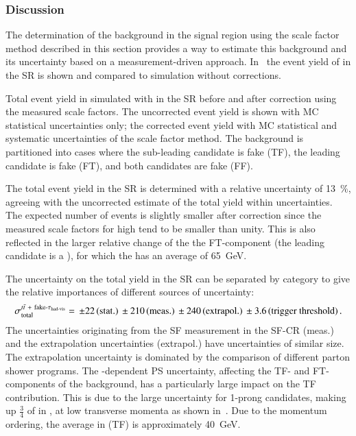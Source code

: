 \subsubsection{Discussion}

The determination of the \ttbarFakes background in the \hadhad signal region
using the scale factor method described in this section provides a way to
estimate this background and its uncertainty based on a measurement-driven
approach. In~ the event yield of \ttbarFakes in the
\hadhad SR is shown and compared to \ttbar simulation without corrections.

\begin{table}[htbp]
  \centering

  \caption{Total event yield in simulated \ttbar with \faketauhadvis
    in the \hadhad SR before and after correction using the measured
    scale factors. The uncorrected event yield is shown with MC
    statistical uncertainties only; the corrected event yield with MC
    statistical and systematic uncertainties of the scale factor
    method. The \ttbarFakes background is partitioned into cases where
    the \pT sub-leading \tauhadvis candidate is fake (TF), the leading
    candidate is fake (FT), and both candidates are fake (FF).}%
  \label{tab:ttbarSF_yields}

  
\end{table}

The total \ttbarFakes event yield in the \hadhad SR is determined with
a relative uncertainty of \SI{13}{\percent}, agreeing with the
uncorrected estimate of the total yield within uncertainties. The
expected number of \ttbarFakes events is slightly smaller after
correction since the measured scale factors for high \pT
\faketauhadvis tend to be smaller than unity. This is also reflected
in the larger relative change of the the FT-component (the leading
\tauhadvis candidate is a \faketauhadvis), for which the
\faketauhadvis has an average \pT of \SI{65}{\GeV}.

The uncertainty on the total \ttbarFakes yield in the \hadhad SR can
be separated by category to give the relative importances of different
sources of uncertainty:
\begin{align*}
  \sigma_\text{total}^{\ttbarFakes} = \valuesep\numerrt{22}{stat.}%
  \valuesep\numerrt{210}{meas.}%
  \valuesep\numerrt{240}{extrapol.}%
  \valuesep\numerrt{3.6}{trigger threshold} \,\text{.}
\end{align*}
The uncertainties originating from the SF measurement in the SF-CR
(meas.) and the extrapolation uncertainties (extrapol.) have
uncertainties of similar size. The extrapolation uncertainty is
dominated by the comparison of different parton shower programs. The
\faketauhadvis \pT-dependent PS uncertainty, affecting the TF- and
FT-components of the background, has a particularly large impact on
the TF contribution. This is due to the large uncertainty for 1-prong
\faketauhadvis candidates, making up $\frac{3}{4}$ of \faketauhadvis
in \ttbar, at low transverse momenta as shown
in~. Due to the momentum ordering,
the average \faketauhadvis \pT in \ttbarFakes (TF) is approximately
\SI{40}{\GeV}.

